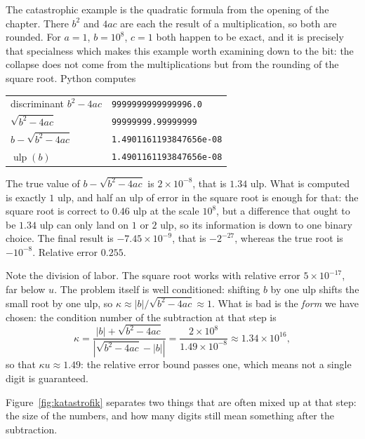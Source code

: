 The catastrophic example is the quadratic formula from the opening of the chapter. There
$b^{2}$ and $4ac$ are each the result of a multiplication, so both are rounded. For
$a=1$, $b=10^{8}$, $c=1$ both happen to be exact, and it is precisely that specialness
which makes this example worth examining down to the bit: the collapse does not come
from the multiplications but from the rounding of the square root. Python computes

\begin{center}
\begin{tabular}{ll}
\hline
discriminant $b^{2}-4ac$ & \texttt{9999999999999996.0} \\
$\sqrt{b^{2}-4ac}$ & \texttt{99999999.99999999} \\
$b-\sqrt{b^{2}-4ac}$ & \texttt{1.4901161193847656e-08} \\
$\operatorname{ulp}(b)$ & \texttt{1.4901161193847656e-08} \\
\hline
\end{tabular}
\end{center}

The true value of $b-\sqrt{b^{2}-4ac}$ is $2\times10^{-8}$, that is $1.34$ ulp.
What is computed is exactly $1$ ulp, and half an ulp of error in the square root is
enough for that: the square root is correct to $0.46$ ulp at the scale $10^{8}$, but a
difference that ought to be $1.34$ ulp can only land on $1$ or $2$ ulp, so its
information is down to one binary choice. The final result is $-7.45\times10^{-9}$, that
is $-2^{-27}$, whereas the true root is $-10^{-8}$. Relative error $0.255$.

Note the division of labor. The square root works with relative error
$5\times10^{-17}$, far below $u$. The problem itself is well conditioned: shifting
$b$ by one ulp shifts the small root by one ulp, so
$\kappa\approx|b|/\sqrt{b^{2}-4ac}\approx1$. What is bad is the \emph{form} we have
chosen: the condition number of the subtraction at that step is
\[
  \kappa=\frac{|b|+\sqrt{b^{2}-4ac}}{\left|\sqrt{b^{2}-4ac}-|b|\right|}
  =\frac{2\times10^{8}}{1.49\times10^{-8}}\approx1.34\times10^{16},
\]
so that $\kappa u\approx1.49$: the relative error bound passes one, which means not a
single digit is guaranteed.

Figure~\ref{fig:katastrofik} separates two things that are often mixed up at that step:
the size of the numbers, and how many digits still mean something after the subtraction.

